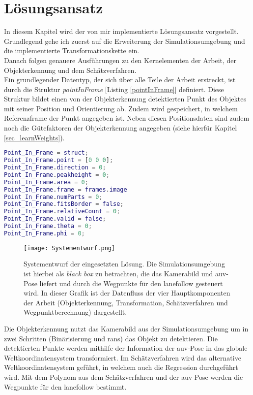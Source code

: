 \cleardoublepage
\section{Lösungsansatz}
In diesem Kapitel wird der von mir implementierte Lösungsansatz vorgestellt. Grundlegend gehe ich zuerst auf die Erweiterung der Simulationsumgebung und die implementierte Transformationskette ein.\\
Danach folgen genauere Ausführungen zu den Kernelementen der Arbeit, der Objekterkennung und dem Schätzverfahren.\\

Ein grundlegender Datentyp, der sich über alle Teile der Arbeit erstreckt, ist durch die Struktur \textit{pointInFrame} [Listing \ref{pointInFrame}] definiert. Diese Struktur bildet einen von der Objekterkennung detektierten Punkt des Objektes mit seiner Position und Orientierung ab. Zudem wird gespeichert, in welchem Referenzframe der Punkt angegeben ist. Neben diesen Positionsdaten sind zudem noch die Gütefaktoren der Objekterkennung angegeben (siehe hierfür Kapitel \ref{sec_learnWeights}).

\begin{lstlisting}[language=Matlab,caption={[Initialisierung der \textit{pointInFrame}-Struktur]Initialisierung der \textit{pointInFrame}-Struktur, die erkannte Punkte in verschiedenen Referenzkoordinatensystemen abbildet.}, label = pointInFrame]
Point_In_Frame = struct;
Point_In_Frame.point = [0 0 0];
Point_In_Frame.direction = 0;
Point_In_Frame.peakheight = 0;
Point_In_Frame.area = 0;
Point_In_Frame.frame = frames.image
Point_In_Frame.numParts = 0;
Point_In_Frame.fitsBorder = false;
Point_In_Frame.relativeCount = 0;
Point_In_Frame.valid = false;
Point_In_Frame.theta = 0;
Point_In_Frame.phi = 0;
\end{lstlisting}

\begin{figure}[H]
\texttt{[image: Systementwurf.png]}
\caption[Systementwurf]{Systementwurf der eingesetzten Lösung. Die Simulationsumgebung ist hierbei als \textit{black box} zu betrachten, die das Kamerabild und \gls{auv}-Pose liefert und durch die Wegpunkte für den \gls{lanefollow} gesteuert wird. In dieser Grafik ist der Datenfluss der vier Hauptkomponenten der Arbeit (Objekterkennung, Transformation, Schätzverfahren und Wegpunktberechnung) dargestellt.}
\end{figure}
Die Objekterkennung nutzt das Kamerabild aus der Simulationsumgebung um in zwei Schritten (Binärisierung und \gls{rans}) das Objekt zu detektieren. Die detektierten Punkte werden mithilfe der Information der \gls{auv}-Pose in das globale Weltkoordinatensystem transformiert. Im Schätzverfahren wird das alternative Weltkoordinatensystem geführt, in welchem auch die Regression durchgeführt wird. Mit dem Polynom aus dem Schätzverfahren und der \gls{auv}-Pose werden die Wegpunkte für den \gls{lanefollow} bestimmt.


\newpage

\newpage

\newpage
